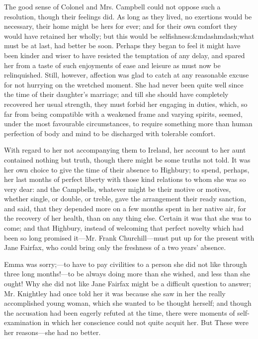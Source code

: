 The good sense of Colonel and Mrs. Campbell could not oppose such a resolution, though their feelings did. As long as they lived, no exertions would be necessary, their home might be hers for ever; and for their own comfort they would have retained her wholly; but this would be selfishness:&mdashmdash;what must be at last, had better be soon. Perhaps they began to feel it might have been kinder and wiser to have resisted the temptation of any delay, and spared her from a taste of such enjoyments of ease and leisure as must now be relinquished. Still, however, affection was glad to catch at any reasonable excuse for not hurrying on the wretched moment. She had never been quite well since the time of their daughter's marriage; and till she should have completely recovered her usual strength, they must forbid her engaging in duties, which, so far from being compatible with a weakened frame and varying spirits, seemed, under the most favourable circumstances, to require something more than human perfection of body and mind to be discharged with tolerable comfort.

With regard to her not accompanying them to Ireland, her account to her aunt contained nothing but truth, though there might be some truths not told. It was her own choice to give the time of their absence to Highbury; to spend, perhaps, her last months of perfect liberty with those kind relations to whom she was so very dear: and the Campbells, whatever might be their motive or motives, whether single, or double, or treble, gave the arrangement their ready sanction, and said, that they depended more on a few months spent in her native air, for the recovery of her health, than on any thing else. Certain it was that she was to come; and that Highbury, instead of welcoming that perfect novelty which had been so long promised it---Mr. Frank Churchill---must put up for the present with Jane Fairfax, who could bring only the freshness of a two years' absence.

Emma was sorry;---to have to pay civilities to a person she did not like through three long months!---to be always doing more than she wished, and less than she ought! Why she did not like Jane Fairfax might be a difficult question to answer; Mr. Knightley had once told her it was because she saw in her the really accomplished young woman, which she wanted to be thought herself; and though the accusation had been eagerly refuted at the time, there were moments of self-examination in which her conscience could not quite acquit her. But  These were her reasons---she had no better.

